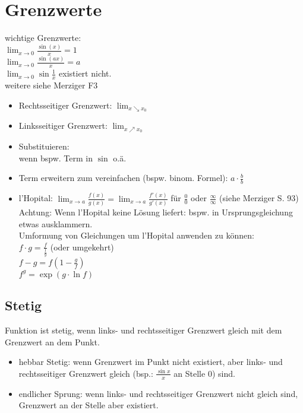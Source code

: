 \documentclass{scrreprt}
\begin{document}
\chapter{Grenzwerte}
wichtige Grenzwerte:\\
$\lim_{x\to0}\frac{\sin (x)}{x}=1$\\ 
$\lim_{x\to 0} \frac{\sin (ax)}{x}=a$\\
$\lim_{x\to 0} \sin \frac{1}{x}$ existiert nicht.\\
weitere siehe Merziger F3
\begin{itemize}
\item Rechtsseitiger Grenzwert: $\lim_{x\searrow x_0}$
\item Linksseitiger Grenzwert: $\lim_{x\nearrow x_0}$
\end{itemize}
\begin{itemize}
\item Substituieren:\\
wenn bspw. Term in $\sin$ o.ä.
\item Term erweitern zum vereinfachen (bspw. binom. Formel): $a\cdot \frac{b}{b}$
\item l'Hopital: $\lim_{x\to a} \frac{f(x)}{g(x)}=\lim_{x \to a} \frac{f'(x)}{g'(x)}$ für $\frac{0}{0}$ oder $\frac{\infty}{\infty}$ (siehe Merziger S. 93)\\
Achtung: Wenn l'Hopital keine Lösung liefert: bspw. in Ursprungsgleichung etwas ausklammern.\\
Umformung von Gleichungen um l'Hopital anwenden zu können:\\
$f\cdot g = \frac{f}{\frac{1}{g}}$ (oder umgekehrt)\\
$f-g=f\left(1-\frac{g}{f}\right)$\\
$f^g=\exp(g\cdot \ln f)$
\end{itemize}
\section{Stetig}
Funktion ist stetig, wenn links- und rechtsseitiger Grenzwert gleich mit dem Grenzwert an dem Punkt.
\begin{itemize}
\item hebbar Stetig: wenn Grenzwert im Punkt nicht existiert, aber links- und rechtsseitiger Grenzwert gleich (bsp.: $\frac{\sin x}{x}$ an Stelle $0$) sind.
\item endlicher Sprung: wenn links- und rechtsseitiger Grenzwert nicht gleich sind, Grenzwert an der Stelle aber existiert.
\end{itemize}
\end{document}
